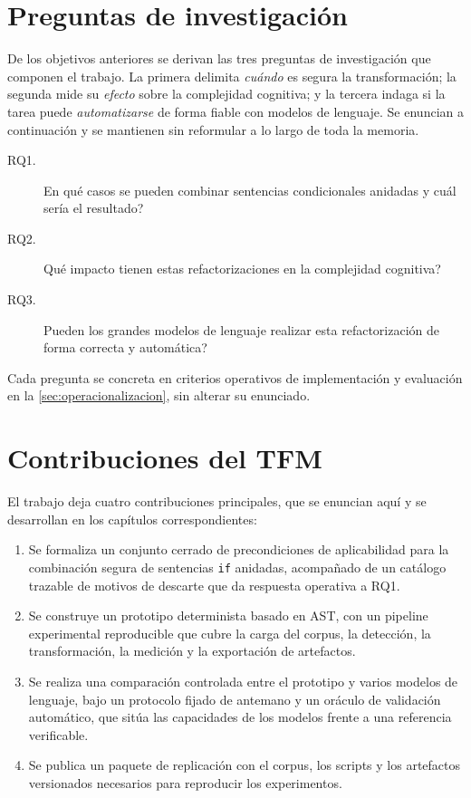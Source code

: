 \section{Preguntas de investigación}
\label{sec:rq-intro}

De los objetivos anteriores se derivan las tres preguntas de investigación que
componen el trabajo. La primera delimita \emph{cuándo} es segura la
transformación; la segunda mide su \emph{efecto} sobre la complejidad cognitiva;
y la tercera indaga si la tarea puede \emph{automatizarse} de forma fiable con
modelos de lenguaje. Se enuncian a continuación y se mantienen sin reformular a
lo largo de toda la memoria.

\begin{description}
  \item[RQ1.] \textquestiondown{}En qué casos se pueden combinar sentencias condicionales anidadas y cuál sería el resultado?
  \item[RQ2.] \textquestiondown{}Qué impacto tienen estas refactorizaciones en la complejidad cognitiva?
  \item[RQ3.] \textquestiondown{}Pueden los grandes modelos de lenguaje realizar esta refactorización de forma correcta y automática?
\end{description}

Cada pregunta se concreta en criterios operativos de implementación y
evaluación en la \autoref{sec:operacionalizacion}, sin alterar su enunciado.

\section{Contribuciones del TFM}
\label{sec:contribuciones}

El trabajo deja cuatro contribuciones principales, que se enuncian aquí y se
desarrollan en los capítulos correspondientes:
\begin{enumerate}
  \item Se formaliza un conjunto cerrado de precondiciones de aplicabilidad para
  la combinación segura de sentencias \lstinline|if| anidadas, acompañado de un
  catálogo trazable de motivos de descarte que da respuesta operativa a RQ1.
  \item Se construye un prototipo determinista basado en AST, con un pipeline
  experimental reproducible que cubre la carga del corpus, la detección, la
  transformación, la medición y la exportación de artefactos.
  \item Se realiza una comparación controlada entre el prototipo y varios modelos
  de lenguaje, bajo un protocolo fijado de antemano y un oráculo de validación
  automático, que sitúa las capacidades de los modelos frente a una referencia
  verificable.
  \item Se publica un paquete de replicación con el corpus, los scripts y los
  artefactos versionados necesarios para reproducir los experimentos.
\end{enumerate}

